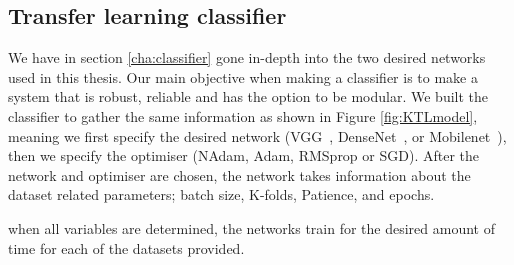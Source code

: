 \subsection{Transfer learning classifier}
We have in section \ref{cha:classifier} gone in-depth into the two desired networks used in this thesis.  Our main objective when making a classifier is to make a system that is robust, reliable and has the option to be modular. 
We built the classifier to gather the same information as shown in Figure \ref{fig:KTLmodel}, meaning we first specify the desired network (VGG~\cite{simonyan2014very}, DenseNet~\cite{DBLP:journals/corr/HuangLW16a}, or Mobilenet~\cite{DBLP:journals/corr/HowardZCKWWAA17}), then we specify the optimiser (NAdam, Adam, RMSprop or SGD).
After the network and optimiser are chosen, the network takes information about the dataset related parameters; batch size, K-folds, Patience, and epochs.

when all variables are determined, the networks train for the desired amount of time for each of the datasets provided.

